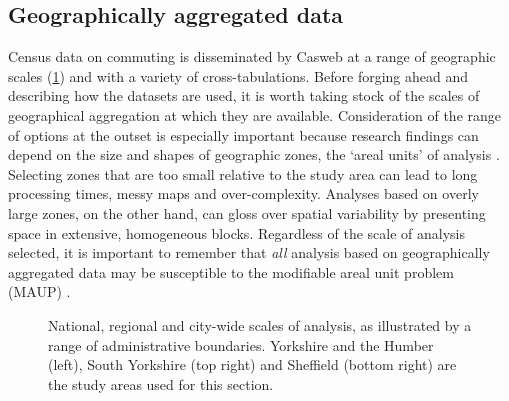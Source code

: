 \subsection{Geographically aggregated data} %
\label{sgeoaggdata}
Census data on commuting is disseminated by Casweb at a range of geographic
scales (\cref{f:scales}) and with a variety of cross-tabulations. Before
forging ahead and describing how the datasets are used, it is worth taking stock
of the scales of geographical aggregation at which they are available.
Consideration of the range
of options at the outset is especially important because research
findings can depend on the size and shapes of geographic zones,
the `areal units' of analysis \citep{Horner2002, Openshaw1983}. Selecting zones
that are too small relative to the study  
area can lead to long processing times, messy maps and over-complexity.
Analyses based on overly large zones, on the other hand, can gloss over
spatial variability by presenting space in extensive, homogeneous blocks.
Regardless of the scale of analysis selected, it is important to remember that
\emph{all} analysis based on geographically aggregated data may be susceptible
to the modifiable areal unit problem (MAUP) \citep{Wong2009}.

\begin{figure}
\caption[National, regional and city-wide scales of analysis]{National, regional
and city-wide scales of analysis, as illustrated
by a range of administrative boundaries. Yorkshire and the Humber (left),
South Yorkshire (top right) and Sheffield (bottom right)
are the study areas used for this section.}
\label{f:scales}
\end{figure}

